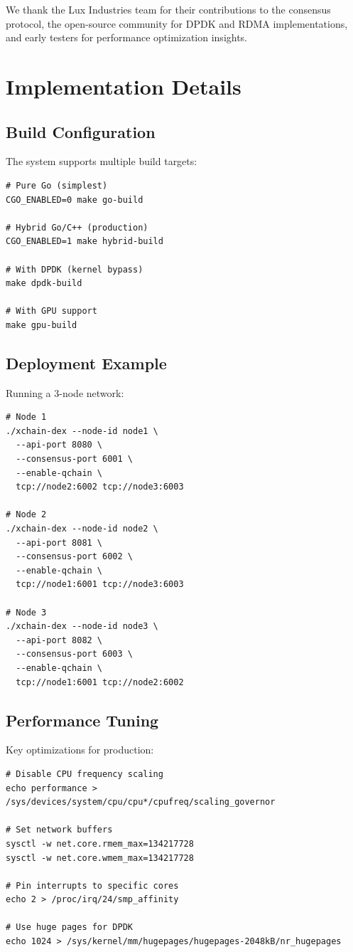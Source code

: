 \documentclass[11pt,a4paper]{article}
\begin{document}
We thank the Lux Industries team for their contributions to the consensus protocol, the open-source community for DPDK and RDMA implementations, and early testers for performance optimization insights.




\appendix

\section{Implementation Details}

\subsection{Build Configuration}

The system supports multiple build targets:

\begin{lstlisting}
# Pure Go (simplest)
CGO_ENABLED=0 make go-build

# Hybrid Go/C++ (production)
CGO_ENABLED=1 make hybrid-build

# With DPDK (kernel bypass)
make dpdk-build

# With GPU support
make gpu-build
\end{lstlisting}

\subsection{Deployment Example}

Running a 3-node network:

\begin{lstlisting}
# Node 1
./xchain-dex --node-id node1 \
  --api-port 8080 \
  --consensus-port 6001 \
  --enable-qchain \
  tcp://node2:6002 tcp://node3:6003

# Node 2
./xchain-dex --node-id node2 \
  --api-port 8081 \
  --consensus-port 6002 \
  --enable-qchain \
  tcp://node1:6001 tcp://node3:6003

# Node 3
./xchain-dex --node-id node3 \
  --api-port 8082 \
  --consensus-port 6003 \
  --enable-qchain \
  tcp://node1:6001 tcp://node2:6002
\end{lstlisting}

\subsection{Performance Tuning}

Key optimizations for production:

\begin{lstlisting}
# Disable CPU frequency scaling
echo performance > /sys/devices/system/cpu/cpu*/cpufreq/scaling_governor

# Set network buffers
sysctl -w net.core.rmem_max=134217728
sysctl -w net.core.wmem_max=134217728

# Pin interrupts to specific cores
echo 2 > /proc/irq/24/smp_affinity

# Use huge pages for DPDK
echo 1024 > /sys/kernel/mm/hugepages/hugepages-2048kB/nr_hugepages
\end{lstlisting}
\end{document}
